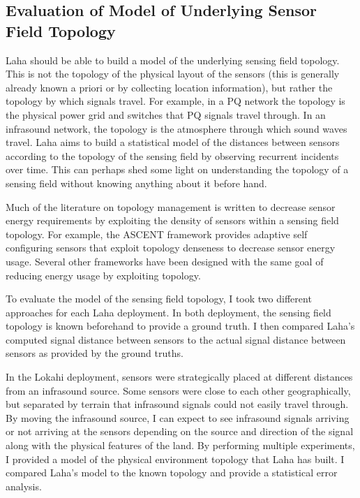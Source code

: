 \subsection{Evaluation of Model of Underlying Sensor Field Topology}\label{subsec:evaluation-of-model-of-underlying-sensor-field-topology}
Laha should be able to build a model of the underlying sensing field topology. This is not the topology of the physical layout of the sensors (this is generally already known a priori or by collecting location information), but rather the topology by which signals travel. For example, in a PQ network the topology is the physical power grid and switches that PQ signals travel through. In an infrasound network, the topology is the atmosphere through which sound waves travel. Laha aims to build a statistical model of the distances between sensors according to the topology of the sensing field by observing recurrent incidents over time. This can perhaps shed some light on understanding the topology of a sensing field without knowing anything about it before hand.

Much of the literature on topology management is written to decrease sensor energy requirements by exploiting the density of sensors within a sensing field topology. For example, the ASCENT\cite{cerpa2004ascent} framework provides adaptive self configuring sensors that exploit topology denseness to decrease sensor energy usage. Several other frameworks have been designed with the same goal of reducing energy usage by exploiting topology\cite{schurgers2002stem,schurgers2002topology}.

To evaluate the model of the sensing field topology, I took two different approaches for each Laha deployment. In both deployment, the sensing field topology is known beforehand to provide a ground truth. I then compared Laha's computed signal distance between sensors to the actual signal distance between sensors as provided by the ground truths.

In the Lokahi deployment, sensors were strategically placed at different distances from an infrasound source. Some sensors were close to each other geographically, but separated by terrain that infrasound signals could not easily travel through. By moving the infrasound source, I can expect to see infrasound signals arriving or not arriving at the sensors depending on the source and direction of the signal along with the physical features of the land. By performing multiple experiments, I provided a model of the physical environment topology that Laha has built. I compared Laha's model to the known topology and provide a statistical error analysis.

